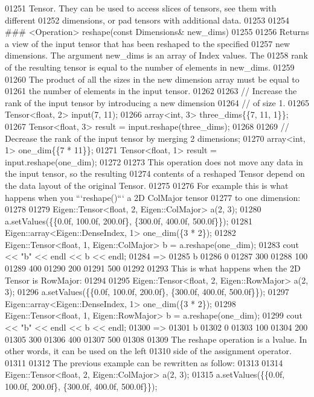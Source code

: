 \begin{DoxyCode}
01251 Tensor.  They can be used to access slices of tensors, see them with different
01252 dimensions, or pad tensors with additional data.
01253 
01254 ### <Operation> reshape(const Dimensions& new\_dims)
01255 
01256 Returns a view of the input tensor that has been reshaped to the specified
01257 new dimensions.  The argument new\_dims is an array of Index values.  The
01258 rank of the resulting tensor is equal to the number of elements in new\_dims.
01259 
01260 The product of all the sizes in the new dimension array must be equal to
01261 the number of elements in the input tensor.
01262 
01263     // Increase the rank of the input tensor by introducing a new dimension
01264     // of size 1.
01265     Tensor<float, 2> input(7, 11);
01266     array<int, 3> three\_dims\{\{7, 11, 1\}\};
01267     Tensor<float, 3> result = input.reshape(three\_dims);
01268 
01269     // Decrease the rank of the input tensor by merging 2 dimensions;
01270     array<int, 1> one\_dim\{\{7 * 11\}\};
01271     Tensor<float, 1> result = input.reshape(one\_dim);
01272 
01273 This operation does not move any data in the input tensor, so the resulting
01274 contents of a reshaped Tensor depend on the data layout of the original Tensor.
01275 
01276 For example this is what happens when you ```reshape()``` a 2D ColMajor tensor
01277 to one dimension:
01278 
01279     Eigen::Tensor<float, 2, Eigen::ColMajor> a(2, 3);
01280     a.setValues(\{\{0.0f, 100.0f, 200.0f\}, \{300.0f, 400.0f, 500.0f\}\});
01281     Eigen::array<Eigen::DenseIndex, 1> one\_dim(\{3 * 2\});
01282     Eigen::Tensor<float, 1, Eigen::ColMajor> b = a.reshape(one\_dim);
01283     cout << "b" << endl << b << endl;
01284     =>
01285     b
01286       0
01287     300
01288     100
01289     400
01290     200
01291     500
01292 
01293 This is what happens when the 2D Tensor is RowMajor:
01294 
01295     Eigen::Tensor<float, 2, Eigen::RowMajor> a(2, 3);
01296     a.setValues(\{\{0.0f, 100.0f, 200.0f\}, \{300.0f, 400.0f, 500.0f\}\});
01297     Eigen::array<Eigen::DenseIndex, 1> one\_dim(\{3 * 2\});
01298     Eigen::Tensor<float, 1, Eigen::RowMajor> b = a.reshape(one\_dim);
01299     cout << "b" << endl << b << endl;
01300     =>
01301     b
01302       0
01303     100
01304     200
01305     300
01306     400
01307     500
01308 
01309 The reshape operation is a lvalue. In other words, it can be used on the left
01310 side of the assignment operator.
01311 
01312 The previous example can be rewritten as follow:
01313 
01314     Eigen::Tensor<float, 2, Eigen::ColMajor> a(2, 3);
01315     a.setValues(\{\{0.0f, 100.0f, 200.0f\}, \{300.0f, 400.0f, 500.0f\}\});

\end{DoxyCode}
